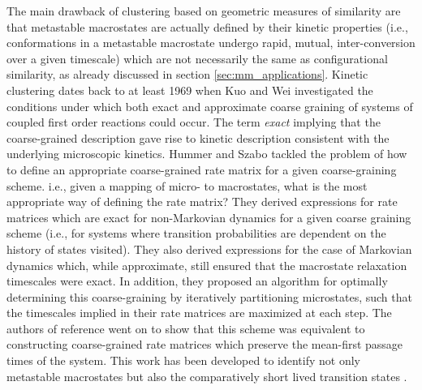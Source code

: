 The main drawback of clustering based on geometric measures of similarity are that metastable macrostates are actually defined by their kinetic properties (i.e., conformations in a metastable macrostate undergo rapid, mutual, inter-conversion over a given timescale) which are not necessarily the same \cite{schutteDirectApproachConformational1999} as configurational similarity, as already discussed in section \ref{sec:mm_applications}. Kinetic clustering dates back to at least 1969 when Kuo and Wei \cite{weiLumpingAnalysisMonomolecular1969, kuoLumpingAnalysisMonomolecular} investigated the conditions under which both exact and approximate coarse graining of systems of coupled first order reactions could occur. The term \emph{exact} implying that the coarse-grained description gave rise to kinetic description consistent with the underlying microscopic kinetics.  Hummer and Szabo \cite{hummerOptimalDimensionalityReduction2015a} tackled the problem of how to define an appropriate coarse-grained rate matrix for a given coarse-graining scheme. i.e., given a mapping of micro- to macrostates, what is the most appropriate way of defining the rate matrix?  They derived expressions for rate matrices which are exact for non-Markovian dynamics  for a given coarse graining scheme (i.e., for systems where transition probabilities are dependent on the history of states visited).  They also derived expressions for the case of Markovian dynamics which, while approximate, still ensured that the macrostate relaxation timescales were exact. In addition, they proposed an algorithm for optimally determining this coarse-graining by iteratively partitioning microstates, such that the timescales implied in their rate matrices are maximized at each step. The authors of reference \cite{kellsCorrelationFunctionsMean2020} went on to show that this scheme was equivalent to constructing coarse-grained rate matrices which preserve the mean-first passage times of the system. This work has been developed to identify not only metastable macrostates but also the comparatively short lived transition states \cite{martiniVariationalIdentificationMarkovian2017}. 


